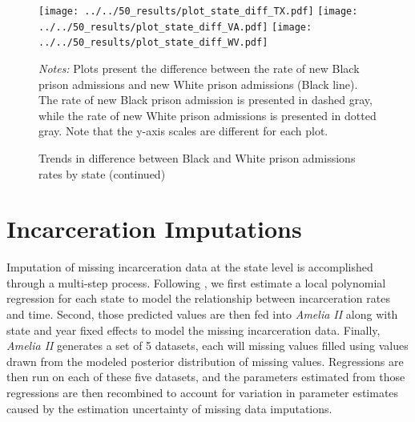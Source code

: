 \documentclass[12pt]{article}
\begin{document}
 \newpage
 \begin{figure}[h!]
 	\begin{center}
 	\caption{Trends in difference between Black and White prison admissions rates by state (continued)}
 	\small

 		\vspace{.2in}
 			\texttt{[image: ../../50\_results/plot\_state\_diff\_TX.pdf]}
 			\texttt{[image: ../../50\_results/plot\_state\_diff\_VA.pdf]}
       \texttt{[image: ../../50\_results/plot\_state\_diff\_WV.pdf]} \\
       \smallskip\smallskip\smallskip
 	\label{figure_difference_states2}
 	\end{center}
   {\scriptsize{\emph{Notes:} Plots present the difference between the rate of new Black prison admissions and new White prison admissions (Black line).  The rate of new Black prison admission is presented in dashed gray, while the rate of new White prison admissions is presented in dotted gray.  Note that the y-axis scales are different for each plot.}}
 \end{figure} \normalsize




 \clearpage \newpage
 \section{Incarceration Imputations}\label{appendix_imputations}
 \setcounter{table}{0}
 \setcounter{figure}{0}
 \renewcommand{\thetable}{E\arabic{table}}
 \renewcommand{\thefigure}{E\arabic{figure}}
 \normalsize

 Imputation of missing incarceration data at the state level is accomplished through a multi-step process. Following , we first estimate a local polynomial regression for each state to model the relationship between incarceration rates and time. Second, those predicted values are then fed into \emph{Amelia II}  along with state and year fixed effects to model the missing incarceration data. Finally, \emph{Amelia II} generates a set of 5 datasets, each will missing values filled using values drawn from the modeled posterior distribution of missing values. Regressions are then run on each of these five datasets, and the parameters estimated from those regressions are then recombined to account for variation in parameter estimates caused by the estimation uncertainty of missing data imputations.
\end{document}
